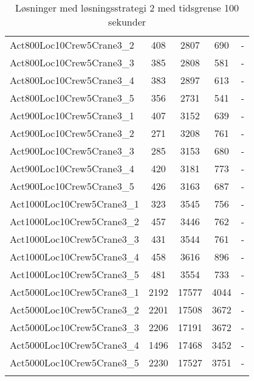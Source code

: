 \begin{center}
\begin{longtable}{ | l | c | c | c | c | }
Act800Loc10Crew5Crane3\_2	&	408	&	2807	&	690	& -\\
Act800Loc10Crew5Crane3\_3	&	385	&	2808	&	581	& -\\
Act800Loc10Crew5Crane3\_4	&	383	&	2897	&	613	& -\\
Act800Loc10Crew5Crane3\_5	&	356	&	2731	&	541	& -\\
Act900Loc10Crew5Crane3\_1	&	407	&	3152	&	639	& -\\
Act900Loc10Crew5Crane3\_2	&	271	&	3208	&	761	& -\\
Act900Loc10Crew5Crane3\_3	&	285	&	3153	&	680	& -\\
Act900Loc10Crew5Crane3\_4	&	420	&	3181	&	773	& -\\
Act900Loc10Crew5Crane3\_5	&	426	&	3163	&	687	& -\\
Act1000Loc10Crew5Crane3\_1	&	323	&	3545	&	756	& -\\
Act1000Loc10Crew5Crane3\_2	&	457	&	3446	&	762	& -\\
Act1000Loc10Crew5Crane3\_3	&	431	&	3544	&	761	& -\\
Act1000Loc10Crew5Crane3\_4	&	458	&	3616	&	896	& -\\
Act1000Loc10Crew5Crane3\_5	&	481	&	3554	&	733	& -\\
Act5000Loc10Crew5Crane3\_1	&	2192	&	17577	&	4044	& -\\
Act5000Loc10Crew5Crane3\_2	&	2201	&	17508	&	3672	& -\\
Act5000Loc10Crew5Crane3\_3	&	2206	&	17191	&	3672	& -\\
Act5000Loc10Crew5Crane3\_4	&	1496	&	17468	&	3452	& -\\
Act5000Loc10Crew5Crane3\_5	&	2230	&	17527	&	3751	& -\\
\hline									
\caption{Løsninger med løsningsstrategi 2 med tidsgrense 100 sekunder}										
\label{tab:solutionAssignAltRFSTF100s}					
\end{longtable}									
\end{center}									